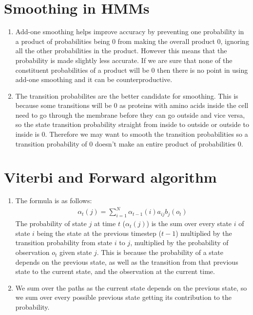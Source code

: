 \documentclass[12pt]{article}
\begin{document}
\section*{Smoothing in HMMs}
\begin{enumerate}
    \item Add-one smoothing helps improve accuracy by preventing one probability in a product of probabilities being 0 from making the overall product 0, ignoring all the other probabilities in the product. However this means that the probability is made slightly less accurate. If we are sure that none of the constituent probabilities of a product will be 0 then there is no point in using add-one smoothing and it can be counterproductive.
    \item The transition probabilites are the better candidate for smoothing. This is because some transitions will be 0 as proteins with amino acids inside the cell need to go through the membrane before they can go outside and vice versa, so the state transition probability straight from inside to outside or outside to inside is 0. Therefore we may want to smooth the transition probabilities so a transition probability of 0 doesn't make an entire product of probabilities 0.
\end{enumerate}

\section*{Viterbi and Forward algorithm}
\begin{enumerate}
    \item The formula is as follows:
    \begin{align*}
        \alpha_t(j) = \sum \limits_{i=1}^{N} \alpha_{t-1}(i)a_{ij}b_j(o_t)
    \end{align*}
    The probability of state $j$ at time $t$ ($\alpha_t(j)$) is the sum over every state $i$ of state $i$ being the state at the previous timestep ($t-1$) multiplied by the transition probability from state $i$ to $j$, multiplied by the probability of observation $o_t$ given state $j$. This is because the probability of a state depends on the previous state, as well as the transition from that previous state to the current state, and the observation at the current time.
    \item We sum over the paths as the current state depends on the previous state, so we sum over every possible previous state getting its contribution to the probability.
\end{enumerate}
\end{document}
